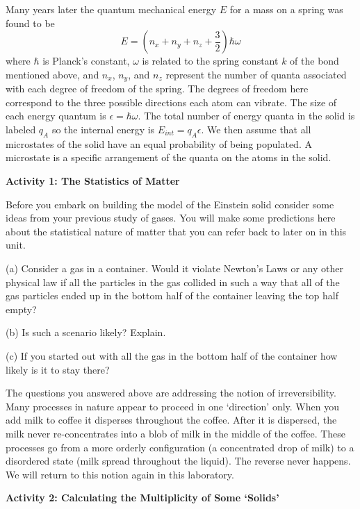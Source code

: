 Many years later the quantum mechanical energy $E$ for a mass on a spring was found 
to be
\begin{equation}
E = (n_x + n_y + n_z + \frac{3}{2})\hbar \omega
\end{equation}
where $\hbar$ is Planck's constant, $\omega$ is related to the spring constant $k$ of the bond
mentioned
above, and $n_x$, $n_y$, and $n_z$ represent the number of quanta associated with each
degree of freedom of the spring.
The degrees of freedom here correspond to the three possible directions each atom can vibrate.
The size of each energy quantum is $\epsilon = \hbar \omega$.
The total number of energy quanta in the solid is labeled $q_A$ so the internal energy is
$E_{int} = q_A\epsilon$.
We then assume that all microstates of the solid have an equal probability of being populated.
A microstate is a specific arrangement of the quanta on the atoms in the solid.

\textbf{Activity 1: The Statistics of Matter}

Before you embark on building the model of the Einstein solid consider some ideas from
your previous study of gases. 
You will make some predictions here about the statistical nature of matter that you can
refer back to later on in this unit.

(a) Consider a gas in a container. Would it violate Newton's Laws or any other physical law
if all the particles in the gas collided in such a way that all of the gas particles
ended up in the bottom half of the container leaving the top half empty?
\vspace{15mm}

(b) Is such a scenario likely? Explain.
\vspace{15mm}

(c) If you started out with all the gas in the bottom half of the container how likely is
it to stay there?
\vspace{15mm}

The questions you answered above are addressing the notion of irreversibility.
Many processes in nature appear to proceed in one `direction' only.
When you add milk to coffee it disperses throughout the coffee.
After it is dispersed, the milk never re-concentrates into a blob of milk in the
middle of the coffee.
These processes go from a more orderly configuration (a concentrated drop of milk)
to a disordered state (milk spread throughout the liquid).
The reverse never happens.
We will return to this notion again in this laboratory.

\textbf{Activity 2: Calculating the Multiplicity of Some `Solids'}

